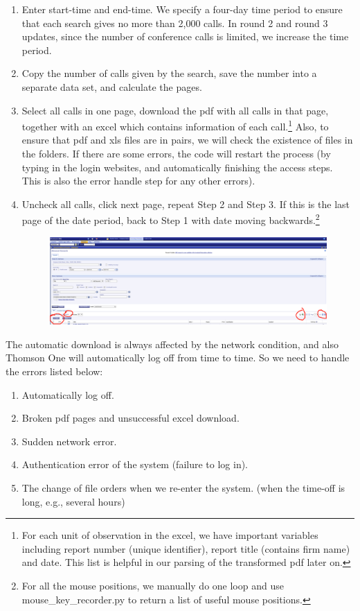 \documentclass[11pt]{article}
\newcounter{file}
\begin{document}
\begin{enumerate}
	\item Enter start-time and end-time. We specify a four-day time period to ensure that each search gives no more than 2,000 calls. In round 2 and round 3 updates, since the number of conference calls is limited, we increase the time period. 
	\item Copy the number of calls given by the search, save the number into a separate data set, and calculate the pages.
	\item Select all calls in one page, download the pdf with all calls in that page, together with an excel which contains information of each call.\footnote{For each unit of observation in the excel, we have important variables including report number (unique identifier), report title (contains firm name) and date. This list is helpful in our parsing of the transformed pdf later on.} Also, to ensure that pdf and xls files are in pairs, we will check the existence of files in the folders. If there are some errors, the code will restart the process (by typing in the login websites, and automatically finishing the access steps. This is also the error handle step for any other errors).
	\item Uncheck all calls, click next page, repeat Step 2 and Step 3. If this is the last page of the date period, back to Step 1 with date moving backwards.\footnote{For all the mouse positions, we manually do one loop and use mouse\_key\_recorder.py to return a list of useful mouse positions.}
	\begin{figure}[H]
	\begin{center}
	\includegraphics[width=.7\textwidth]{Figures/open_step4.png}
	\end{center}
	\end{figure}
\end{enumerate}
\par The automatic download is always affected by the network condition, and also Thomson One will automatically log off from time to time. So we need to handle the errors listed below:
\begin{enumerate}
	\item Automatically log off.
	\item Broken pdf pages and unsuccessful excel download.
	\item Sudden network error.
	\item Authentication error of the system (failure to log in).
	\item The change of file orders when we re-enter the system. (when the time-off is long, e.g., several hours)
\end{enumerate}
\end{document}
